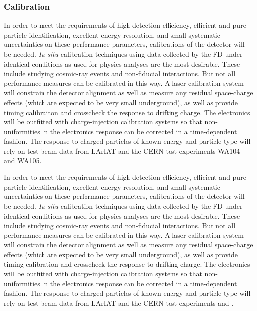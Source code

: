 
\subsubsection{Calibration}

In order to meet the requirements of high detection efficiency, efficient and
pure particle identification, excellent energy resolution, and small systematic
uncertainties on these performance parameters, calibrations of the detector
will be needed.  {\it In situ} calibration techniques using data collected by the FD
under identical conditions as used for physics analyses are the most desirable.
These include studying cosmic-ray events and non-fiducial interactions.  But not
all performance measures can be calibrated in this way.  A laser calibration system
will constrain the detector alignment as well as measure any residual space-charge effects
(which are expected to be very small underground), as well as provide timing calibraiton
and crosscheck the response to drifting charge.  The electronics will be outfitted with
charge-injection calibration systems so that non-uniformities in the electronics response
can be corrected in a time-dependent fashion.  The response to charged particles of known
energy and particle type will rely on test-beam data from LArIAT and the CERN test
experiments WA104 and WA105.


In order to meet the requirements of high detection efficiency, efficient and
pure particle identification, excellent energy resolution, and small systematic
uncertainties on these performance parameters, calibrations of the detector
will be needed.  {\it In situ} calibration techniques using data collected by the FD
under identical conditions as used for physics analyses are the most desirable.
These include studying cosmic-ray events and non-fiducial interactions.  But not
all performance measures can be calibrated in this way.  A laser calibration system
will constrain the detector alignment as well as measure any residual space-charge effects
(which are expected to be very small underground), as well as provide timing calibration
and crosscheck the response to drifting charge.  The electronics will be outfitted with
charge-injection calibration systems so that non-uniformities in the electronics response
can be corrected in a time-dependent fashion.  The response to charged particles of known
energy and particle type will rely on test-beam data from LArIAT and the CERN test
experiments \cernsingleproto{} and \cerndualproto.
